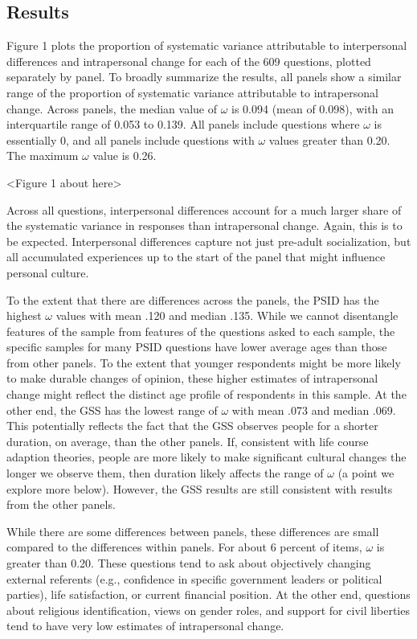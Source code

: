 \documentclass[
  12pt,
]{article}
\begin{document}
\hypertarget{results}{%
\subsection{Results}\label{results}}

Figure 1 plots the proportion of systematic variance attributable to
interpersonal differences and intrapersonal change for each of the 609
questions, plotted separately by panel. To broadly summarize the
results, all panels show a similar range of the proportion of systematic
variance attributable to intrapersonal change. Across panels, the median
value of \(\omega\) is 0.094 (mean of 0.098), with an interquartile
range of 0.053 to 0.139. All panels include questions where \(\omega\)
is essentially 0, and all panels include questions with \(\omega\)
values greater than 0.20. The maximum \(\omega\) value is 0.26.

\begin{center}
<Figure 1 about here>
\end{center}

Across all questions, interpersonal differences account for a much
larger share of the systematic variance in responses than intrapersonal
change. Again, this is to be expected. Interpersonal differences capture
not just pre-adult socialization, but all accumulated experiences up to
the start of the panel that might influence personal culture.

To the extent that there are differences across the panels, the PSID has
the highest \(\omega\) values with mean .120 and median .135. While we
cannot disentangle features of the sample from features of the questions
asked to each sample, the specific samples for many PSID questions have
lower average ages than those from other panels. To the extent that
younger respondents might be more likely to make durable changes of
opinion, these higher estimates of intrapersonal change might reflect
the distinct age profile of respondents in this sample. At the other
end, the GSS has the lowest range of \(\omega\) with mean .073 and
median .069. This potentially reflects the fact that the GSS observes
people for a shorter duration, on average, than the other panels. If,
consistent with life course adaption theories, people are more likely to
make significant cultural changes the longer we observe them, then
duration likely affects the range of \(\omega\) (a point we explore more
below). However, the GSS results are still consistent with results from
the other panels.

While there are some differences between panels, these differences are
small compared to the differences within panels. For about 6 percent of
items, \(\omega\) is greater than 0.20. These questions tend to ask
about objectively changing external referents (e.g., confidence in
specific government leaders or political parties), life satisfaction, or
current financial position. At the other end, questions about religious
identification, views on gender roles, and support for civil liberties
tend to have very low estimates of intrapersonal change.
\end{document}
